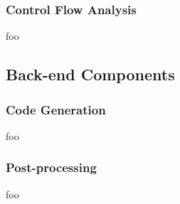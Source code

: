 \subsubsection{Control Flow Analysis}





foo


\subsection{Back-end Components}


\subsubsection{Code Generation}

foo


\subsubsection{Post-processing}

foo
